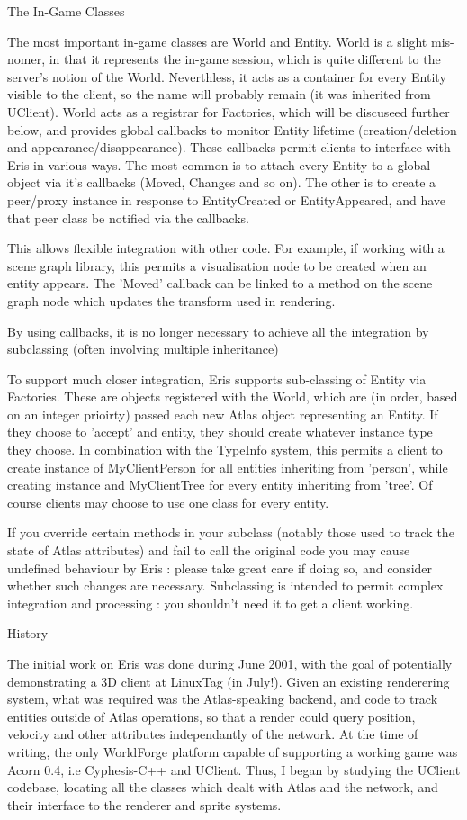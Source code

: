 \documentclass{article}
\begin{document}
{The In-Game Classes

The most important in-game classes are World and Entity. World is a slight mis-nomer, in that it represents the in-game session, which is quite different to the server's notion of the World. Neverthless, it acts as a container for every Entity visible to the client, so the name will probably remain (it was inherited from UClient). World acts as a registrar for Factories, which will be discuseed further below, and provides global callbacks to monitor Entity lifetime (creation/deletion and appearance/disappearance). These callbacks permit clients to interface with Eris in various ways. The most common is to attach every Entity to a global object via it's callbacks (Moved, Changes and so on). The other is to create a peer/proxy instance in response to EntityCreated or EntityAppeared, and have that peer class be notified via the callbacks.

This allows flexible integration with other code. For example, if working with a scene graph library, this permits a visualisation node to be created when an entity appears. The 'Moved' callback can be linked to a method on the scene graph node which updates the transform used in rendering.

By using callbacks, it is no longer necessary to achieve all the integration by subclassing (often involving multiple inheritance)

To support much closer integration, Eris supports sub-classing of Entity via Factories. These are objects registered with the World, which are (in order, based on an integer prioirty) passed each new Atlas object representing an Entity. If they choose to 'accept' and entity, they should create whatever instance type they choose. In combination with the TypeInfo system, this permits a client to create instance of MyClientPerson for all entities inheriting from 'person', while creating instance and MyClientTree for every entity inheriting from 'tree'. Of course clients may choose to use one class for every entity.

If you override certain methods in your subclass (notably those used to track the state of Atlas attributes) and fail to call the original code you may cause undefined behaviour by Eris : please take great care if doing so, and consider whether such changes are necessary. Subclassing is intended to permit complex integration and processing : you shouldn't need it to get a client working. 

History 

The initial work on Eris was done during June 2001, with the goal of potentially demonstrating a 3D client at LinuxTag (in July!). Given an existing renderering system, what was required was the Atlas-speaking backend, and code to track entities outside of Atlas operations, so that a render could query position, velocity and other attributes independantly of the network. At the time of writing, the only WorldForge platform capable of supporting a working game was Acorn 0.4, i.e Cyphesis-C++ and UClient. Thus, I began by studying the UClient codebase, locating all the classes which dealt with Atlas and the network, and their interface to the renderer and sprite systems.

}
\end{document}

